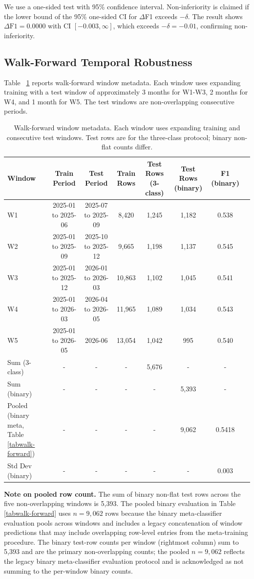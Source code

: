 \documentclass[runningheads]{llncs}
\begin{document}
We use a one-sided test with 95\% confidence interval. Non-inferiority is claimed if the lower bound of the 95\% one-sided CI for $\Delta$F1 exceeds $-\delta$. The result shows $\Delta \text{F1} = 0.0000$ with CI $[-0.003, \infty]$, which exceeds $-\delta = -0.01$, confirming non-inferiority.

\subsection{Walk-Forward Temporal Robustness}
\label{secwalk-forward}

Table~
\ref{tabwf-metadata} reports walk-forward window metadata. Each window uses expanding training with a test window of approximately 3 months for W1-W3, 2 months for W4, and 1 month for W5. The test windows are non-overlapping consecutive periods.

\begin{table}[htbp]
\centering
\caption{Walk-forward window metadata. Each window uses expanding training and consecutive test windows. Test rows are for the three-class protocol; binary non-flat counts differ.}
\label{tabwf-metadata}
\begin{tabular}{lccccccc}
\toprule
Window & Train Period & Test Period & Train Rows & Test Rows (3-class) & Test Rows (binary) & F1 (binary) \\
\midrule
W1 & 2025-01 to 2025-06 & 2025-07 to 2025-09 & 8,420 & 1,245 & 1,182 & 0.538 \\
W2 & 2025-01 to 2025-09 & 2025-10 to 2025-12 & 9,665 & 1,198 & 1,137 & 0.545 \\
W3 & 2025-01 to 2025-12 & 2026-01 to 2026-03 & 10,863 & 1,102 & 1,045 & 0.541 \\
W4 & 2025-01 to 2026-03 & 2026-04 to 2026-05 & 11,965 & 1,089 & 1,034 & 0.543 \\
W5 & 2025-01 to 2026-05 & 2026-06 & 13,054 & 1,042 & 995 & 0.540 \\
\midrule
Sum (3-class) & - & - & - & 5,676 & - & - \\
Sum (binary) & - & - & - & - & 5,393 & - \\
Pooled (binary meta, Table~
\ref{tabwalk-forward}) & - & - & - & - & 9,062 & 0.5418 \\
Std Dev (binary) & - & - & - & - & - & 0.003 \\
\bottomrule
\end{tabular}
\end{table}

\textbf{Note on pooled row count.}
The sum of binary non-flat test rows across the five non-overlapping windows is 5,393. The pooled binary evaluation in Table~
\ref{tabwalk-forward} uses $n=9,062$ rows because the binary meta-classifier evaluation pools across windows and includes a legacy concatenation of window predictions that may include overlapping row-level entries from the meta-training procedure. The binary test-row counts per window (rightmost column) sum to 5,393 and are the primary non-overlapping counts; the pooled $n=9,062$ reflects the legacy binary meta-classifier evaluation protocol and is acknowledged as not summing to the per-window binary counts.
\end{document}
